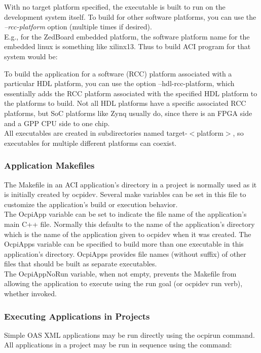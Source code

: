 \documentclass[10pt, a4paper, oneside]{article}
\renewcommand\_{\textunderscore\allowbreak} %
\begin{document}
With no target platform specified, the executable is built to run on the development system itself.  To build for other software platforms, you can use the \emph{--rcc-platform} option (multiple times if desired).\\
E.g., for the ZedBoard embedded platform, the software platform name for the embedded linux is something like xilinx13\_3. Thus to build ACI program for that system would be:
\begin{ocpixml}
\end{ocpixml}
To build the application for a software (RCC) platform associated with a particular HDL platform, you can use the option --hdl-rcc-platform, which essentially adds the RCC platform associated with the specified HDL platform to the platforms to build.  Not all HDL platforms have a specific associated RCC platforms, but SoC platforms like Zynq usually do, since there is an FPGA side and a GPP CPU side to one chip.\\

All executables are created in subdirectories named target-$<$platform$>$, so executables for multiple different platforms can coexist. 
\subsubsection{Application Makefiles} The Makefile in an ACI application's directory in a project is normally used as it is initially created by ocpidev. Several make variables can be set in this file to customize the application's build or execution behavior.\\

The OcpiApp variable can be set to indicate the file name of the application's main C++ file.  Normally this defaults to the name of the application's directory which is the name of the application given to ocpidev when it was created.  The OcpiApps variable can be specified to build more than one executable in this application's directory.  OcpiApps provides file names (without suffix) of other files that should be built as separate executables. \\
The OcpiAppNoRun variable, when not empty, prevents the Makefile from allowing the application to execute using the run goal (or ocpidev run verb), whether invoked.
\subsubsection{Executing Applications in Projects} Simple OAS XML applications may be run directly using the ocpirun command.  All applications in a project may be run in sequence using the command:
\end{document}
